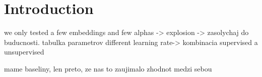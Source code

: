 \chapter*{Introduction}
\* %
\* %

{}
\* %

\* %
\* %
\* %


{}
\* %


{}
\* %
\* %
\* %
\* %
\* %
\* we only tested a few embeddings and few  alphas -> explosion  -> zasolychaj do buducnosti.
tabulka parametrov
different learning rate-> 
\* 
kombinacia supervised a unsupervised

        
        
{}
\* mame baseliny, len preto, ze nas to zaujimalo
\* zhodnot medzi sebou



{}
\* %


{}
\* %



\* %
